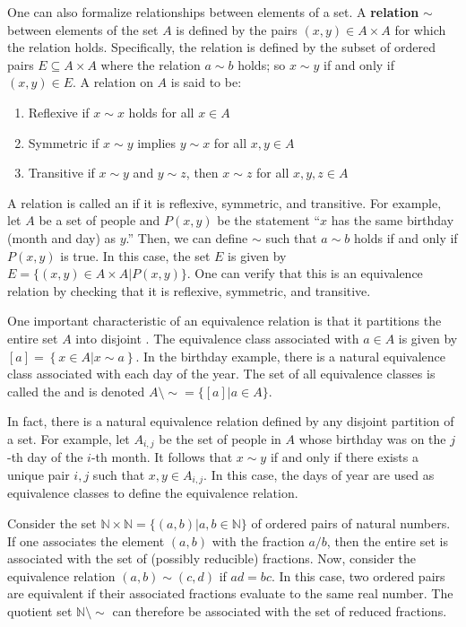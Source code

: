 One can also formalize relationships between elements of a set.
A \textbf{relation} $\sim$ between elements of the set $A$ is defined by the pairs $(x,y)\in A\times A$ for which the relation holds.
Specifically, the relation is defined by the subset of ordered pairs $E\subseteq A\times A$ where the relation $a\sim b$ holds; so $x\sim y$ if and only if $(x,y)\in E$.
A relation on $A$ is said to be:
\begin{enumerate}
\item Reflexive if $x\sim x$ holds for all $x\in A$
\item Symmetric if $x\sim y$ implies $y\sim x$ for all $x,y\in A$
\item Transitive if $x\sim y$ and $y\sim z$, then $x\sim z$ for all $x,y,z\in A$
\end{enumerate}

A relation is called an  if it is reflexive, symmetric, and transitive.
For example, let $A$ be a set of people and $P(x,y)$ be the statement ``$x$ has the same birthday (month and day) as $y$.''
Then, we can define $\sim$ such that $a\sim b$ holds if and only if $P(x,y)$ is true.
In this case, the set $E$ is given by $E = \{ (x,y)\in A\times A | P(x,y) \}$.
One can verify that this is an equivalence relation by checking that it is reflexive, symmetric, and transitive.

One important characteristic of an equivalence relation is that it partitions the entire set $A$ into disjoint .
The equivalence class associated with $a\in A$ is given by  $[a] = \left\{x\in A | x \sim a\right\}$.
In the birthday example, there is a natural equivalence class associated with each day of the year.
The set of all equivalence classes is called the  and is denoted $A \setminus \!\sim = \{ [a] | a\in A \}$.

In fact, there is a natural equivalence relation defined by any disjoint partition of a set.
For example, let $A_{i,j}$ be the set of people in $A$ whose birthday was on the $j$-th day of the $i$-th month.
It follows that $x\sim y$ if and only if there exists a unique pair $i,j$ such that $x,y \in A_{i,j}$.
In this case, the days of year are used as equivalence classes to define the equivalence relation.

\begin{example}
Consider the set $\mathbb{N} \times \mathbb{N} = \{ (a,b) | a,b\in\mathbb{N} \}$ of ordered pairs of natural numbers.
If one associates the element $(a,b)$ with the fraction $a/b$, then the entire set is associated with the set of (possibly reducible) fractions.
Now, consider the equivalence relation $(a,b) \sim (c,d)$ if $ad=bc$.
In this case, two ordered pairs are equivalent if their associated fractions evaluate to the same real number.
The quotient set $\mathbb{N} \setminus \!\sim$ can therefore be associated with the set of reduced fractions.
\end{example}


